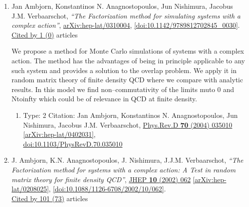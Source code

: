 \documentclass[a4paper,10pt]{article}
\begin{document}
\begin{enumerate}
\begin{enumerate}
\end{enumerate}
\item Jan Ambjorn, Konstantinos N. Anagnostopoulos, Jun Nishimura, Jacobus J.M. Verbaarschot, {\it ``The Factorization method for simulating systems with a complex action''}, \href{https://arxiv.org/abs/hep-lat/0310004}{arXiv:hep-lat/0310004}, \href{https://www.doi.org/10.1142/9789812702845_0030}{[doi:10.1142/9789812702845\_0030]}.
\\\href{https://inspirehep.net/literature/?q=refersto%3Arecid%3A629664}{Cited by 1 (0)} articles

We propose a method for Monte Carlo simulations of systems with a complex action. The method has the advantages of being in principle applicable to any such system and provides a solution to the overlap problem. We apply it in random matrix theory of finite density QCD where we compare with analytic results. In this model we find non--commutativity of the limits muto 0 and Ntoinfty which could be of relevance in QCD at finite density.
\begin{enumerate}
  \item Type: 2 Citation: Jan Ambjorn, Konstantinos N. Anagnostopoulos, Jun Nishimura, Jacobus J.M. Verbaarschot, \href{https://www.doi.org/10.1103/PhysRevD.70.035010}{Phys.Rev.D {\bf 70} (2004) 035010}  \href{https://arxiv.org/abs/hep-lat/0402031}{[arXiv:hep-lat/0402031]},\\\href{https://www.doi.org/10.1103/PhysRevD.70.035010}{doi:10.1103/PhysRevD.70.035010}
\end{enumerate}
\item J. Ambjorn, K.N. Anagnostopoulos, J. Nishimura, J.J.M. Verbaarschot, {\it ``The Factorization method for systems with a complex action: A Test in random matrix theory for finite density QCD''}, \href{https://www.doi.org/10.1088/1126-6708/2002/10/062}{JHEP {\bf 10} (2002) 062} \href{https://arxiv.org/abs/hep-lat/0208025}{[arXiv:hep-lat/0208025]}, \href{https://www.doi.org/10.1088/1126-6708/2002/10/062}{[doi:10.1088/1126-6708/2002/10/062]}.
\\\href{https://inspirehep.net/literature/?q=refersto%3Arecid%3A593052}{Cited by 101 (73)} articles


\end{enumerate}
\end{document}
